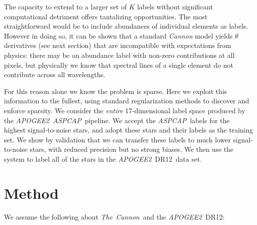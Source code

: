 \documentclass[12pt,preprint]{aastex}
\newcommand{\project}[1]{\textsl{#1}}
\newcommand{\TheCannon}{\project{The~Cannon}}
\newcommand{\acronym}[1]{{\small{#1}}}
\newcommand{\apogee}{\project{\acronym{APOGEE2}}}
\newcommand{\aspcap}{\project{\acronym{ASPCAP}}}
\newcommand{\dr}{\acronym{DR12}}
\begin{document}
The capacity to extend to a larger set of $K$ labels without significant
computational detriment offers tantalizing opportunities.  The most 
straightforward would be to include abundances of individual elements as labels.
However in doing so, it can be shown that a standard \emph{Cannon} model yields
$\theta$ derivatives (see next section) that are incompatible with expectations
from physics: there may be an abundance label with non-zero contributions at all
pixels, but physically we know that spectral lines of a single element do not 
contribute across all wavelengths.  

For this reason alone we know the problem is sparse.  Here we exploit this 
information to the fullest, using standard regularization methods to discover
and enforce sparsity. We consider the \emph{entire} 17-dimensional label space 
produced by the \apogee\ \aspcap\ pipeline.  We accept the \aspcap\ labels for 
the highest signal-to-noise stars, and adopt these stars and their labels as the
training set.  We show by validation that we can transfer these labels to much 
lower signal-to-noise stars, with reduced precision but no strong biases.  We
then use the system to label all of the stars in the \apogee\ \dr\ data set.




\section{Method}

\noindent{}We assume the following about \TheCannon\ and the \apogee\ \dr:
\end{document}
